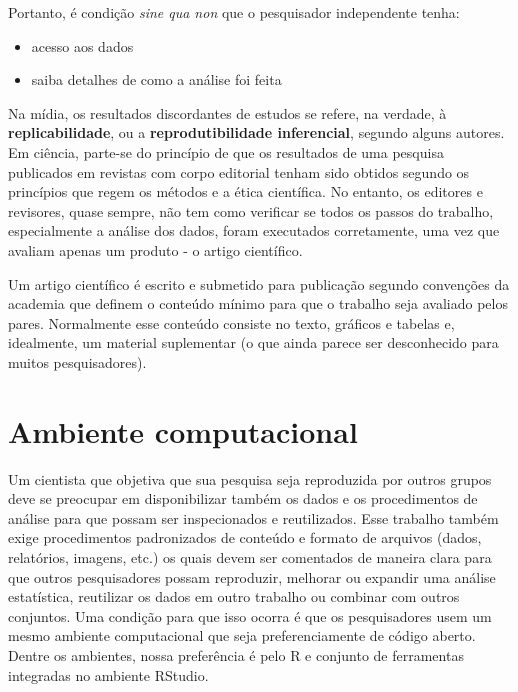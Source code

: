 \documentclass[]{book}
\providecommand{\tightlist}{%
  \setlength{\itemsep}{0pt}\setlength{\parskip}{0pt}}
\begin{document}
Portanto, é condição \emph{sine qua non} que o pesquisador independente
tenha:

\begin{itemize}
\tightlist
\item
  acesso aos dados
\item
  saiba detalhes de como a análise foi feita
\end{itemize}

Na mídia, os resultados discordantes de estudos se refere, na verdade, à
\textbf{replicabilidade}, ou a \textbf{reprodutibilidade inferencial},
segundo alguns autores. Em ciência, parte-se do princípio de que os
resultados de uma pesquisa publicados em revistas com corpo editorial
tenham sido obtidos segundo os princípios que regem os métodos e a ética
científica. No entanto, os editores e revisores, quase sempre, não tem
como verificar se todos os passos do trabalho, especialmente a análise
dos dados, foram executados corretamente, uma vez que avaliam apenas um
produto - o artigo científico.

Um artigo científico é escrito e submetido para publicação segundo
convenções da academia que definem o conteúdo mínimo para que o trabalho
seja avaliado pelos pares. Normalmente esse conteúdo consiste no texto,
gráficos e tabelas e, idealmente, um material suplementar (o que ainda
parece ser desconhecido para muitos pesquisadores).

\hypertarget{ambiente-computacional}{%
\section*{Ambiente computacional}\label{ambiente-computacional}}

Um cientista que objetiva que sua pesquisa seja reproduzida por outros
grupos deve se preocupar em disponibilizar também os dados e os
procedimentos de análise para que possam ser inspecionados e
reutilizados. Esse trabalho também exige procedimentos padronizados de
conteúdo e formato de arquivos (dados, relatórios, imagens, etc.) os
quais devem ser comentados de maneira clara para que outros
pesquisadores possam reproduzir, melhorar ou expandir uma análise
estatística, reutilizar os dados em outro trabalho ou combinar com
outros conjuntos. Uma condição para que isso ocorra é que os
pesquisadores usem um mesmo ambiente computacional que seja
preferenciamente de código aberto. Dentre os ambientes, nossa
preferência é pelo R e conjunto de ferramentas integradas no ambiente
RStudio.
\end{document}
